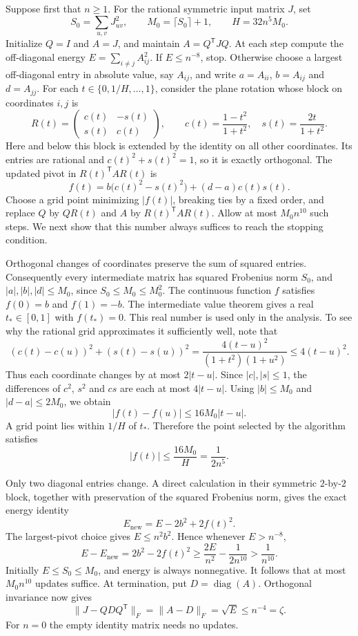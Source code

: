 \documentclass[11pt,a4paper]{article}
\theoremstyle{definition}
\theoremstyle{remark}
\begin{document}
Suppose first that $n\ge1$. For the rational symmetric input matrix $J$, set
\[
 S_0=\sum_{u,v}J_{uv}^2,\qquad
 M_0=\lceil S_0\rceil+1,\qquad H=32n^5M_0.
\]
Initialize $Q=I$ and $A=J$, and maintain $A=Q^{\mathsf T}JQ$.
At each step compute the off-diagonal energy
$E=\sum_{i\ne j}A_{ij}^2$. If $E\le n^{-8}$, stop.
Otherwise choose a largest off-diagonal entry in absolute value, say
$A_{ij}$, and write $a=A_{ii}$, $b=A_{ij}$ and $d=A_{jj}$.
For each $t\in\{0,1/H,\ldots,1\}$, consider the plane rotation whose
block on coordinates $i,j$ is
\[
 R(t)=\begin{pmatrix}c(t)&-s(t)\\s(t)&c(t)\end{pmatrix},\qquad
 c(t)=\frac{1-t^2}{1+t^2},\quad s(t)=\frac{2t}{1+t^2}.
\]
Here and below this block is extended by the identity on all other
coordinates. Its entries are rational and $c(t)^2+s(t)^2=1$, so it is
exactly orthogonal. The updated pivot in $R(t)^{\mathsf T}AR(t)$ is
\[
 f(t)=b\bigl(c(t)^2-s(t)^2\bigr)+(d-a)c(t)s(t).
\]
Choose a grid point minimizing $|f(t)|$, breaking ties by a fixed order,
and replace $Q$ by $QR(t)$ and $A$ by $R(t)^{\mathsf T}AR(t)$.
Allow at most $M_0n^{10}$ such steps. We next show that this number
always suffices to reach the stopping condition.

Orthogonal changes of coordinates preserve the sum of squared entries.
Consequently every intermediate matrix has squared Frobenius norm $S_0$,
and $|a|,|b|,|d|\le M_0$, since $S_0\le M_0\le M_0^2$.
The continuous function $f$ satisfies $f(0)=b$ and $f(1)=-b$.
The intermediate value theorem gives a real $t_*\in[0,1]$ with
$f(t_*)=0$. This real number is used only in the analysis.
To see why the rational grid approximates it sufficiently well, note that
\[
 (c(t)-c(u))^2+(s(t)-s(u))^2
 =\frac{4(t-u)^2}{(1+t^2)(1+u^2)}\le4(t-u)^2.
\]
Thus each coordinate changes by at most $2|t-u|$. Since $|c|,|s|\le1$,
the differences of $c^2$, $s^2$ and $cs$ are each at most $4|t-u|$.
Using $|b|\le M_0$ and $|d-a|\le2M_0$, we obtain
\[
 |f(t)-f(u)|\le16M_0|t-u|.
\]
A grid point lies within $1/H$ of $t_*$. Therefore the point selected
by the algorithm satisfies
\[
 |f(t)|\le\frac{16M_0}{H}=\frac{1}{2n^5}.
\]

Only two diagonal entries change. A direct calculation in their symmetric
$2$-by-$2$ block, together with preservation of the squared Frobenius norm,
gives the exact energy identity
\[
 E_{\mathrm{new}}=E-2b^2+2f(t)^2.
\]
The largest-pivot choice gives $E\le n^2b^2$. Hence whenever $E>n^{-8}$,
\[
 E-E_{\mathrm{new}}
 =2b^2-2f(t)^2
 \ge\frac{2E}{n^2}-\frac{1}{2n^{10}}
 >\frac{1}{n^{10}}.
\]
Initially $E\le S_0\le M_0$, and energy is always nonnegative.
It follows that at most $M_0n^{10}$ updates suffice. At termination, put
$D=\operatorname{diag}(A)$. Orthogonal invariance now gives
\[
 \|J-QDQ^{\mathsf T}\|_F
 =\|A-D\|_F=\sqrt E\le n^{-4}=\zeta.
\]
For $n=0$ the empty identity matrix needs no updates.
\end{document}
